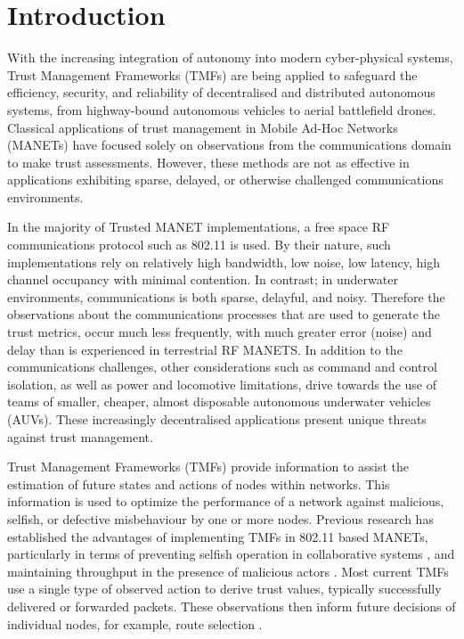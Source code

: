 \documentclass{aamas2016}
\begin{document}



\section{Introduction}
With the increasing integration of autonomy into modern cyber-physical systems, Trust Management Frameworks (TMFs) are being applied to safeguard the efficiency, security, and reliability of decentralised and distributed autonomous systems, from highway-bound autonomous vehicles to aerial battlefield drones. 
Classical applications of trust management in Mobile Ad-Hoc Networks (MANETs) have focused solely on observations from the communications domain to make trust assessments. 
However, these methods are not as effective in applications exhibiting sparse, delayed, or otherwise challenged communications environments\cite{Pavan2015}. 

In the majority of Trusted MANET implementations, a free space RF communications protocol such as 802.11 is used.
By their nature, such implementations rely on relatively high bandwidth, low noise, low latency, high channel occupancy with minimal contention.
In contrast; in underwater environments, communications is both sparse, delayful, and noisy.
Therefore the observations about the communications processes that are used to generate the trust metrics, occur much less frequently, with much greater error (noise) and delay than is experienced in terrestrial RF MANETS.
In addition to the communications challenges, other considerations such as command and control isolation, as well as power and locomotive limitations, drive towards the use of teams of smaller,  cheaper, almost disposable autonomous underwater vehicles (AUVs). These increasingly decentralised applications present unique threats against trust management. 

Trust Management Frameworks (TMFs) provide information to assist the estimation of future states and actions of nodes within networks. This information is used to optimize the performance of a network against malicious, selfish, or defective misbehaviour by one or more nodes. Previous research has established the advantages of implementing TMFs in 802.11 based MANETs, particularly in terms of preventing selfish operation in collaborative systems \cite{Li2007}, and maintaining throughput in the presence of malicious actors \cite{Buchegger2002}. Most current TMFs use a single type of observed action to derive trust values, typically successfully delivered or forwarded packets. These observations then inform future decisions of individual nodes, for example, route selection \cite{Li2008}.
\end{document}
